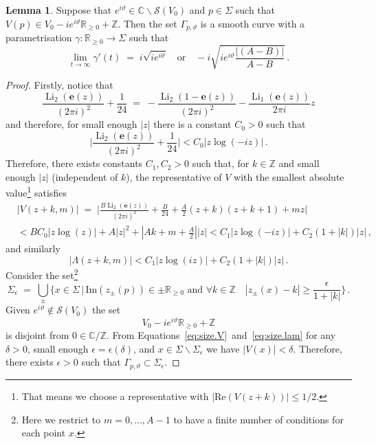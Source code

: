 \documentclass[12pt,reqno]{amsart}
\theoremstyle{definition}
\newtheorem{lemma}[theorem]{Lemma}
\def\BZ{\mathbb Z}
\def\BR{\mathbb R}
\def\BC{\mathbb C}
\def\Re{\mathrm{Re}}
\def\Im{\mathrm{Im}}
\def\be{\begin{equation}}
\def\ee{\end{equation}}
\def\e{\mathbf e}
\renewcommand{\=}{\;=\;}
\newcommand{\Li}{\operatorname{Li}}
\begin{document}
\begin{lemma}\label{lem:thimble}
Suppose that $ e^{i\vartheta}\in\BC\backslash\mathcal{S}(V_{0})$ and $p\in\Sigma$ such that $V(p)\in V_0-i e^{i\vartheta}\BR_{\geq0}+\BZ$. Then the set $\Gamma_{p,\vartheta}$ is a smooth curve with a parametrisation $\gamma:\BR_{\geq0}\rightarrow\Sigma$ such that
\be\label{eq:tangent.lim}
  \lim_{t\to\infty}
  \gamma'(t)
  \=
  i\sqrt{i e^{i\vartheta}}
  \quad\text{or}\quad
  -i\sqrt{i e^{i\vartheta}\frac{|(A-B)|}{A-B}}\,.
\ee
\end{lemma}
\begin{proof}
Firstly, notice that
\be
  \frac{\Li_{2}(\e(z))}{(2\pi i)^2}+\frac{1}{24}
  \=
  -\frac{\Li_{2}(1-\e(z))}{(2\pi i)^2}
  -\frac{\Li_{1}(\e(z))}{2\pi i}z
\ee
and therefore, for small enough $|z|$ there is a constant $C_0>0$ such that
\be
  \Big|\frac{\Li_{2}(\e(z))}{(2\pi i)^2}+\frac{1}{24}\Big|
  <
  C_0|z\log(-iz)|\,.
\ee
Therefore, there exists constants $C_1,C_2>0$ such that, for $k\in\BZ$ and small enough $|z|$ (independent of $k$), the representative of $V$ with the smallest absolute value\footnote{That means we choose a representative with $|\Re(V(z+k))|\leq1/2$.} satisfies
\be\label{eq:size.V}
\begin{aligned}
  &|V(z+k,m)|
  \=
  \bigg|\frac{B\Li_{2}(\e(z))}{(2\pi i)^2}+\frac{B}{24}
  +\frac{A}{2}(z+k)(z+k+1)+mz\bigg|\\
  &<
  BC_0|z\log(z)|
  +
  A|z|^2+|Ak+m+\frac{A}{2}||z|
  <
  C_1|z\log(-iz)|+C_2(1+|k|)|z|\,,
\end{aligned}
\ee
and similarly
\be\label{eq:size.lam}
  |\Lambda(z+k,m)|
  <
  C_1|z\log(iz)|+C_2(1+|k|)|z|\,.
\ee
Consider the set\footnote{Here we restrict to $m=0,\dots,A-1$ to have a finite number of conditions for each point $x$.}
\be
  \Sigma_\epsilon\=\bigcup_{\pm}\Big\{x\in\Sigma\,\Big|\,\Im(z_{\pm}(p))\in\pm\BR_{\geq0}\text{ and }\forall k\in\BZ\quad|z_{\pm}(x)-k|\geq\frac{\epsilon}{1+|k|}\Big\}\,.
\ee
Given $ e^{i\vartheta}\notin\mathcal{S}(V_{0})$ the set
\be
  V_0-i e^{i\vartheta}\BR_{\geq0}+\BZ
\ee
is disjoint from $0\in\BC/\BZ$. From Equations~\eqref{eq:size.V}~and~\eqref{eq:size.lam} for any $\delta>0$, small enough $\epsilon=\epsilon(\delta)$, and $x\in\Sigma\backslash\Sigma_{\epsilon}$ we have $|V(x)|<\delta$. Therefore, there exists $\epsilon>0$ such that $\Gamma_{p,\vartheta}\subset\Sigma_\epsilon$. 


\end{proof}
\end{document}
